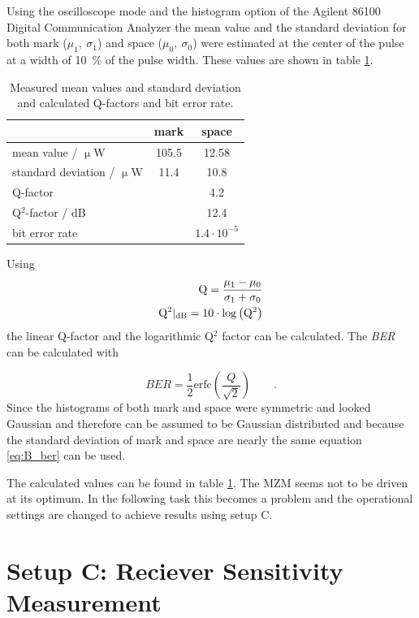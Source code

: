 Using the oscilloscope mode and the histogram option of the Agilent 86100 Digital Communication Analyzer the mean value and the standard deviation for both mark ($\mu_1,~\sigma_1$) and space ($\mu_0,~\sigma_0$) were estimated at the center of the pulse at a width of 10~\% of the pulse width. These values are shown in table \ref{tab:B_Q}.

\begin{table}%
\centering
\caption{Measured mean values and standard deviation and calculated Q-factors and bit error rate.}
 
\begin{tabular}{lcc}
\toprule
&mark&space\\
\midrule
mean value / $\upmu$W&105.5	&12.58	\\
standard deviation / $\upmu$W&11.4	&10.8	\\\midrule
Q-factor&	&	4.2\\
Q$^2$-factor / dB	&	&12.4\\
bit error rate	&	&$1.4\cdot 10^{-5}$\\
\bottomrule 
\end{tabular}
\label{tab:B_Q}
\end{table}

Using 
\begin{equation}
\begin{split}
\mathrm{Q} = \frac{\mu_1-\mu_0}{\sigma_1+\sigma_0}\\
\mathrm{Q}^2|_{\mathrm{dB}} = 10\cdot \mathrm{log}\left(\mathrm{Q}^2\right)
\label{eq:}
\end{split}
\end{equation} 
the linear Q-factor and the logarithmic Q$^2$ factor can be calculated. The \textit{BER} can be calculated with

\begin{equation}
BER = \frac{1}{2}\mathrm{erfc}\left(\frac{Q}{\sqrt{2}}\right)\qquad.
\label{eq:B_ber}
\end{equation}
Since the histograms of both mark and space were symmetric and looked Gaussian and therefore can be assumed to be Gaussian distributed and because the standard deviation of mark and space are nearly the same equation \eqref{eq:B_ber} can be used.

The calculated values can be found in table \ref{tab:B_Q}. The MZM seems not to be driven at its optimum. In the following task this becomes a problem and the operational settings are changed to achieve results using setup C.


\newpage
\section{Setup C: Reciever Sensitivity Measurement}


